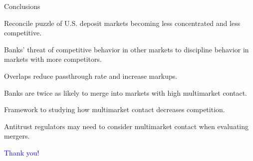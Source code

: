 \documentclass[notes,10.2pt, aspectratio=169]{beamer}
\newenvironment{wideitemize}{\itemize\addtolength{\itemsep}{10pt}}{\enditemize}
\begin{document}
      \begin{frame}{Conclusions}
        \vspace{0.5cm}
        \begin{wideitemize}
        \item Reconcile puzzle of U.S. deposit markets becoming less concentrated and less competitive. 
    \begin{wideitemize}
      \vspace{0.2cm}
        \item Banks' threat of competitive behavior in other markets to discipline behavior in markets with more competitors. 
        \item Overlaps reduce passthrough rate and increase markups. 
        \item Banks are twice as likely to merge into markets with high multimarket contact. 
 \end{wideitemize}

 \item Framework to studying how multimarket contact decreases competition.

        \item Antitrust regulators may need to consider multimarket contact when evaluating mergers.
      \end{wideitemize}
          
\end{frame}

\begin{frame}[noframenumbering]
\textcolor{blue}{\huge{\centerline{Thank you!}}}
\end{frame}

%    
%    


\end{document}
